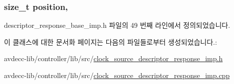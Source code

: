 \subsubsection[{\texorpdfstring{position}{position}}]{\setlength{\rightskip}{0pt plus 5cm}size\+\_\+t position\hspace{0.3cm}{\ttfamily [protected]}, {\ttfamily [inherited]}}\hypertarget{classavdecc__lib_1_1descriptor__response__base__imp_a7a04afe5347934be732ec70a70bd0a28}{}\label{classavdecc__lib_1_1descriptor__response__base__imp_a7a04afe5347934be732ec70a70bd0a28}


descriptor\+\_\+response\+\_\+base\+\_\+imp.\+h 파일의 49 번째 라인에서 정의되었습니다.



이 클래스에 대한 문서화 페이지는 다음의 파일들로부터 생성되었습니다.\+:\begin{DoxyCompactItemize}
\item 
avdecc-\/lib/controller/lib/src/\hyperlink{clock__source__descriptor__response__imp_8h}{clock\+\_\+source\+\_\+descriptor\+\_\+response\+\_\+imp.\+h}\item 
avdecc-\/lib/controller/lib/src/\hyperlink{clock__source__descriptor__response__imp_8cpp}{clock\+\_\+source\+\_\+descriptor\+\_\+response\+\_\+imp.\+cpp}\end{DoxyCompactItemize}
